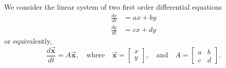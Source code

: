\documentclass[reqno]{immbook}
\newcommand{\BX}{\vec{\textbf{x}}}
\numberwithin{equation}{chapter}
\numberwithin{question}{section}
\numberwithin{theorem}{chapter}
\numberwithin{figure}{chapter}
\theoremstyle{definition}
\begin{document}
We consider the linear system of two first order
differential equations
\begin{equation}
\begin{split}
  \frac{dx}{dt} & = ax + by \\
  \frac{dy}{dt} & = cx + dy
\end{split}
\label{eqn:linearsys_scalar_eqns}
\end{equation}
or equivalently,
\begin{equation}
  \frac{d\BX}{dt} = A\BX, \quad \textrm{where} \quad
     \BX = \begin{bmatrix} x \\ y \end{bmatrix},
     \quad \textrm{and} \quad
     A = \begin{bmatrix} a & b \\ c & d \end{bmatrix}.
\label{eqn:linearsys}
\end{equation}
\end{document}
